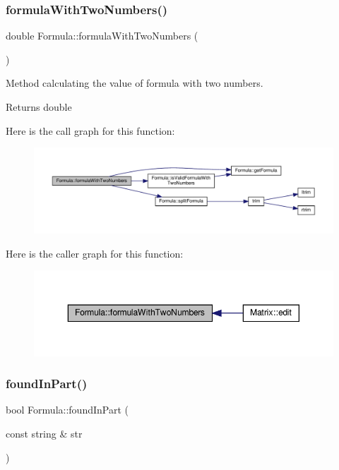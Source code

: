 \subsubsection{\texorpdfstring{formula\+With\+Two\+Numbers()}{formulaWithTwoNumbers()}}
{\footnotesize\ttfamily double Formula\+::formula\+With\+Two\+Numbers (\begin{DoxyParamCaption}{ }\end{DoxyParamCaption})}

Method calculating the value of formula with two numbers. \begin{DoxyReturn}{Returns}
double 
\end{DoxyReturn}
Here is the call graph for this function\+:\nopagebreak
\begin{figure}[H]
\begin{center}
\leavevmode
\includegraphics[width=350pt]{class_formula_a2159ffdb34d80f2bee422eee89fc871a_cgraph}
\end{center}
\end{figure}
Here is the caller graph for this function\+:\nopagebreak
\begin{figure}[H]
\begin{center}
\leavevmode
\includegraphics[width=350pt]{class_formula_a2159ffdb34d80f2bee422eee89fc871a_icgraph}
\end{center}
\end{figure}
\mbox{\label{class_formula_a79079cea46f8320cd7a63f576251baac}} 
\subsubsection{\texorpdfstring{found\+In\+Part()}{foundInPart()}}
{\footnotesize\ttfamily bool Formula\+::found\+In\+Part (\begin{DoxyParamCaption}\item[{const string \&}]{str }\end{DoxyParamCaption})\hspace{0.3cm}{\ttfamily [private]}}

